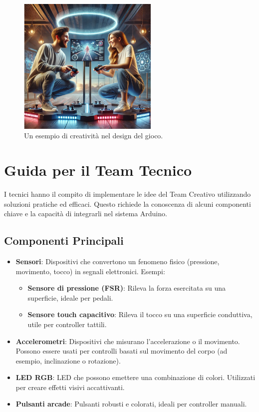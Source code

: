\documentclass[a4paper,12pt]{report}
\begin{document}
\begin{figure}[ht!]
    \centering
    \includegraphics[width=0.6\textwidth]{creativi.png}
    \caption{Un esempio di creativit\`a nel design del gioco.}
    \label{fig:creativi}
\end{figure}

\section{Guida per il Team Tecnico}
I tecnici hanno il compito di implementare le idee del Team Creativo utilizzando soluzioni pratiche ed efficaci. Questo richiede la conoscenza di alcuni componenti chiave e la capacit\`a di integrarli nel sistema Arduino.

\subsection{Componenti Principali}
\begin{itemize}
    \item \textbf{Sensori}: Dispositivi che convertono un fenomeno fisico (pressione, movimento, tocco) in segnali elettronici. Esempi:
    \begin{itemize}
        \item \textbf{Sensore di pressione (FSR)}: Rileva la forza esercitata su una superficie, ideale per pedali.
        \item \textbf{Sensore touch capacitivo}: Rileva il tocco su una superficie conduttiva, utile per controller tattili.
    \end{itemize}
    \item \textbf{Accelerometri}: Dispositivi che misurano l'accelerazione o il movimento. Possono essere usati per controlli basati sul movimento del corpo (ad esempio, inclinazione o rotazione).
    \item \textbf{LED RGB}: LED che possono emettere una combinazione di colori. Utilizzati per creare effetti visivi accattivanti.
    \item \textbf{Pulsanti arcade}: Pulsanti robusti e colorati, ideali per controller manuali.
\end{itemize}
\end{document}
